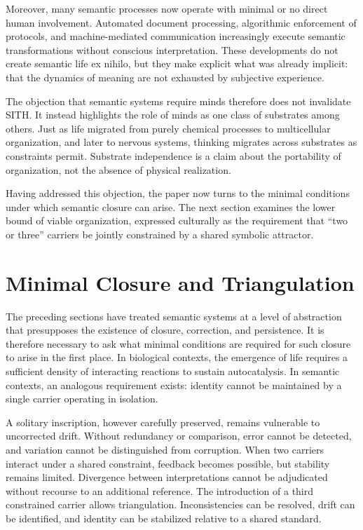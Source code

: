 \documentclass[11pt,oneside]{article}
\begin{document}
Moreover, many semantic processes now operate with minimal or no direct human involvement. Automated document processing, algorithmic enforcement of protocols, and machine-mediated communication increasingly execute semantic transformations without conscious interpretation. These developments do not create semantic life ex nihilo, but they make explicit what was already implicit: that the dynamics of meaning are not exhausted by subjective experience.

The objection that semantic systems require minds therefore does not invalidate SITH. It instead highlights the role of minds as one class of substrates among others. Just as life migrated from purely chemical processes to multicellular organization, and later to nervous systems, thinking migrates across substrates as constraints permit. Substrate independence is a claim about the portability of organization, not the absence of physical realization.

Having addressed this objection, the paper now turns to the minimal conditions under which semantic closure can arise. The next section examines the lower bound of viable organization, expressed culturally as the requirement that “two or three” carriers be jointly constrained by a shared symbolic attractor.


\section{Minimal Closure and Triangulation} 

The preceding sections have treated semantic systems at a level of abstraction that presupposes the existence of closure, correction, and persistence. It is therefore necessary to ask what minimal conditions are required for such closure to arise in the first place. In biological contexts, the emergence of life requires a sufficient density of interacting reactions to sustain autocatalysis. In semantic contexts, an analogous requirement exists: identity cannot be maintained by a single carrier operating in isolation.

A solitary inscription, however carefully preserved, remains vulnerable to uncorrected drift. Without redundancy or comparison, error cannot be detected, and variation cannot be distinguished from corruption. When two carriers interact under a shared constraint, feedback becomes possible, but stability remains limited. Divergence between interpretations cannot be adjudicated without recourse to an additional reference. The introduction of a third constrained carrier allows triangulation. Inconsistencies can be resolved, drift can be identified, and identity can be stabilized relative to a shared standard.
\end{document}
